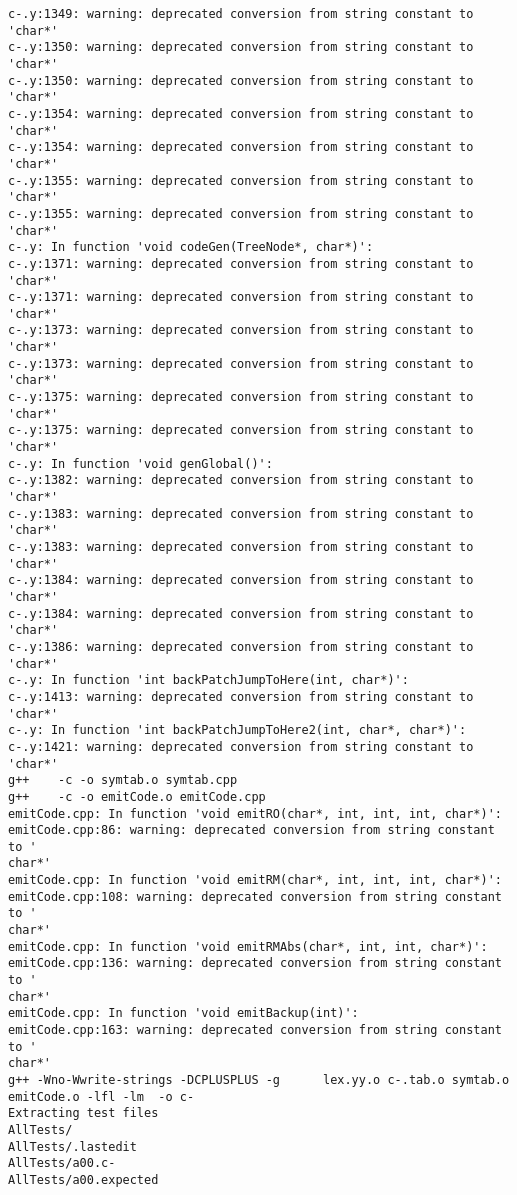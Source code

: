 \documentclass[12pt]{book}
\begin{document}
\begin{lstlisting}
c-.y:1349: warning: deprecated conversion from string constant to 'char*'
c-.y:1350: warning: deprecated conversion from string constant to 'char*'
c-.y:1350: warning: deprecated conversion from string constant to 'char*'
c-.y:1354: warning: deprecated conversion from string constant to 'char*'
c-.y:1354: warning: deprecated conversion from string constant to 'char*'
c-.y:1355: warning: deprecated conversion from string constant to 'char*'
c-.y:1355: warning: deprecated conversion from string constant to 'char*'
c-.y: In function 'void codeGen(TreeNode*, char*)':
c-.y:1371: warning: deprecated conversion from string constant to 'char*'
c-.y:1371: warning: deprecated conversion from string constant to 'char*'
c-.y:1373: warning: deprecated conversion from string constant to 'char*'
c-.y:1373: warning: deprecated conversion from string constant to 'char*'
c-.y:1375: warning: deprecated conversion from string constant to 'char*'
c-.y:1375: warning: deprecated conversion from string constant to 'char*'
c-.y: In function 'void genGlobal()':
c-.y:1382: warning: deprecated conversion from string constant to 'char*'
c-.y:1383: warning: deprecated conversion from string constant to 'char*'
c-.y:1383: warning: deprecated conversion from string constant to 'char*'
c-.y:1384: warning: deprecated conversion from string constant to 'char*'
c-.y:1384: warning: deprecated conversion from string constant to 'char*'
c-.y:1386: warning: deprecated conversion from string constant to 'char*'
c-.y: In function 'int backPatchJumpToHere(int, char*)':
c-.y:1413: warning: deprecated conversion from string constant to 'char*'
c-.y: In function 'int backPatchJumpToHere2(int, char*, char*)':
c-.y:1421: warning: deprecated conversion from string constant to 'char*'
g++    -c -o symtab.o symtab.cpp
g++    -c -o emitCode.o emitCode.cpp
emitCode.cpp: In function 'void emitRO(char*, int, int, int, char*)':
emitCode.cpp:86: warning: deprecated conversion from string constant to '
char*'
emitCode.cpp: In function 'void emitRM(char*, int, int, int, char*)':
emitCode.cpp:108: warning: deprecated conversion from string constant to '
char*'
emitCode.cpp: In function 'void emitRMAbs(char*, int, int, char*)':
emitCode.cpp:136: warning: deprecated conversion from string constant to '
char*'
emitCode.cpp: In function 'void emitBackup(int)':
emitCode.cpp:163: warning: deprecated conversion from string constant to '
char*'
g++ -Wno-Wwrite-strings -DCPLUSPLUS -g      lex.yy.o c-.tab.o symtab.o 
emitCode.o -lfl -lm  -o c- 
Extracting test files
AllTests/
AllTests/.lastedit
AllTests/a00.c-
AllTests/a00.expected

\end{lstlisting}
\end{document}
